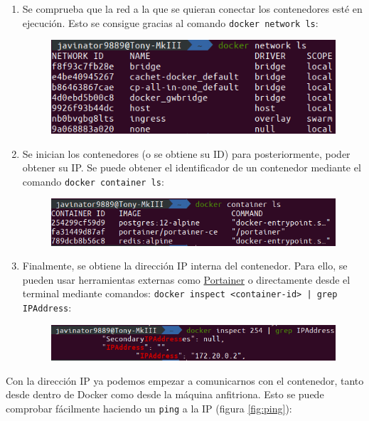 \begin{enumerate}
    \item Se comprueba que la red a la que se quieran conectar los contenedores esté
          en ejecución. Esto se consigue gracias al comando \lstinline[style=bash]!docker network ls!:
          \begin{figure}[H]
              \centering
              \includegraphics[width=.6\linewidth]{pictures/network-ls.png}
          \end{figure}

    \item Se inician los contenedores (o se obtiene su ID) para posteriormente, poder
          obtener su IP. Se puede obtener el identificador de un contenedor mediante
          el comando \lstinline[style=bash]!docker container ls!:
          \begin{figure}[H]
              \centering
              \includegraphics[width=.5\linewidth]{pictures/container-ls.png}
          \end{figure}

    \item Finalmente, se obtiene la dirección IP interna del contenedor. Para ello,
          se pueden usar herramientas externas como \href{https://www.portainer.io/}{Portainer}
          o directamente desde el terminal mediante comandos: \lstinline[style=bash]!docker inspect <container-id> | grep IPAddress!:
          \begin{figure}[H]
              \centering
              \includegraphics[width=.5\linewidth]{pictures/ip-address.png}
          \end{figure}
\end{enumerate}

Con la dirección IP ya podemos empezar a comunicarnos con el contenedor, tanto
desde dentro de Docker como desde la máquina anfitriona. Esto se puede comprobar
fácilmente haciendo un \texttt{ping} a la IP (figura \ref{fig:ping}):

